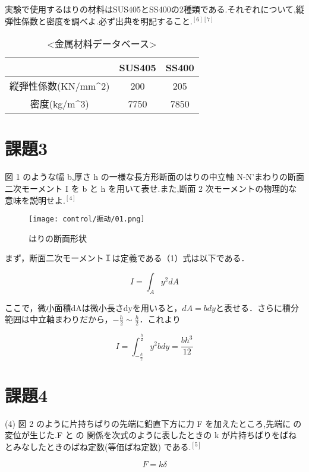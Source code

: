 \documentclass[xelatex,ja=standard,jafont=noto]{bxjsarticle}
\begin{document}
実験で使用するはりの材料はSUS405とSS400の2種類である.それぞれについて,縦弾性係数と密度を調べよ.必ず出典を明記すること.$ ^{[6][7]} $


\begin{table}[!htbp]
\centering
\caption{<金属材料データベース>}
\begin{tabular}{ccc}
\hline
& SUS405 & SS400 \\
\hline
縦弾性係数(KN/mm^{2})& 200& 205\\
密度(kg/m^{3}) & 7750& 7850\\
\hline
\end{tabular}
\end{table}



\section{課題3}

図 1 のような幅 b,厚さ h の一様な長方形断面のはりの中立軸 N-N'まわりの断面二次モーメント I を
b と h を用いて表せ.また,断面 2 次モーメントの物理的な意味を説明せよ.$ ^{[4]} $


\begin{figure}[h!]
    \centering
    \texttt{[image: control/振动/01.png]}
    \caption{はりの断面形状}
\end{figure}


まず，断面二次モーメントＩは定義である（1）式は以下である．


\begin{equation}
			I=\int_{A}^{}y^{2}dA
\end{equation}


ここで，微小面積dAは微小長さdyを用いると，$ dA=bdy $と表せる．さらに積分範囲は中立軸まわりだから，$ -\frac{h}{2}\sim\frac{h}{2} $．これより

\begin{equation}
			I=\int_{-\frac{h}{2}}^{\frac{h}{2}}y^{2}bdy=\frac{bh^{3}}{12}
\end{equation}


\section{課題4}
(4) 図 2 のように片持ちばりの先端に鉛直下方に力 F を加えたところ,先端にの変位が生じた.F との
関係を次式のように表したときの k が片持ちばりをばねとみなしたときのばね定数(等価ばね定数)
である.$ ^{[5]} $



\begin{equation}
			F=k\delta
\end{equation}
\end{document}
